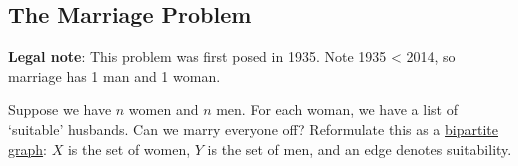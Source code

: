 \documentclass{article}
\begin{document}
\subsection{The Marriage Problem}
\textbf{Legal note}: This problem was first posed in 1935. Note 1935 < 2014, so marriage has 1 man and 1 woman.

Suppose we have $n$ women and $n$ men. For each woman, we have a list of `suitable' husbands. Can we marry everyone off?
Reformulate this as a \hyperlink{def:bipartite}{bipartite graph}: $X$ is the set of women, $Y$ is the set of men, and an edge denotes suitability.
\end{document}
